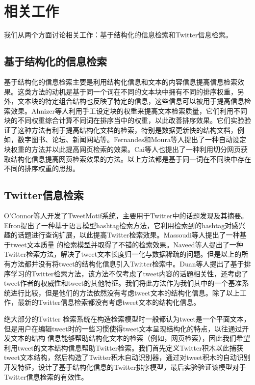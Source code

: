 \section{相关工作}
\label{sec:rel}
我们从两个方面讨论相关工作：基于结构化的信息检索和Twitter信息检索。
\subsection{基于结构化的信息检索}
基于结构化的信息检索主要是利用结构化信息和文本的内容信息提高信息检索效果。这类方法的动机是基于同一个词在不同的文本块中拥有不同的排序权重，另外，文本块的特定组合结构也反映了特定的信息，这些信息可以被用于提高信息检索效果。Ahnizer等人利用手工设定块的权重来提高文本检索质量，它们利用不同块的不同权重综合计算不同词在排序当中的权重，以此改善排序效果。它们实验验证了这种方法有利于提高结构化文档的检索，特别是数据更新快的结构文档，例如，数字图书、论坛、新闻网站等。Fernandes和Moura等人提出了一种自动设定块权重的方法并以此提高网页检索的效果。Cai等人也提出了一种利用切分网页获取结构化信息提高网页检索效果的方法。以上方法都是基于同一词在不同块中存在不同的排序权重的思想。

\subsection{Twitter信息检索}
O'Connor等人开发了TweetMotif系统，主要用于Twitter中的话题发现及其摘要。Efron提出了一种基于语言模型hashtag检索方法，它利用检索到的hashtag对感兴趣的话题进行查询扩展，以此提高Twitter检索效果。Massoudi等人提出了一种基于tweet文本质量
的检索模型并取得了不错的检索效果。Naveed等人提出了一种Twitter检索方法，解决了tweet文本长度归一化与数据稀疏的问题。但是以上的所有方法都并没有将tweet的结构化信息引入Twitter检索中。Duan等人提出了基于排序学习的Twitter检索方法，该方法不仅考虑了tweet内容的话题相关性，还考虑了tweet作者的权威性和tweet的其他特征。我们将此方法作为我们其中的一个基准系统进行比较，但是他们的方法依然没有考虑tweet文本的结构化信息。除了以上工作，最新的Twitter信息检索都没有考虑tweet文本的结构化信息。

绝大部分的Twitter 检索系统在构造检索模型时一般都认为tweet是一个平面文本，但是用户在编辑tweet时的一些习惯使得tweet文本呈现结构化的特点，以往通过开发文本的结构
信息能够帮助结构化文本的检索（例如，网页检索），因此我们希望利用tweet的文本结构信息帮助Twitter检索。我们首先定义Twitter积木以此捕获tweet文本结构，然后构造了Twitter积木自动识别器，通过对tweet积木的自动识别开发特征，设计了基于结构化信息的Twitter排序模型，最后实验验证该模型对于Twitter信息检索的有效性。

